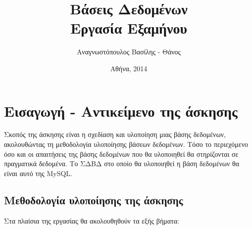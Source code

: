 \documentclass{assignment}
\title{Βάσεις Δεδομένων \\ Εργασία Εξαμήνου}
\date{Αθήνα, 2014}
\author{Αναγνωστόπουλος Βασίλης - Θάνος}
\begin{document}
\maketitle

\setcounter{page}{1} 

\pagestyle{plain}
\tableofcontents
\newpage


\pagestyle{fancy}
\setcounter{page}{1} 

\section{Εισαγωγή - Αντικείμενο της άσκησης}

Σκοπός της άσκησης είναι η σχεδίαση και υλοποίηση μιας βάσης δεδομένων,
ακολουθώντας τη μεθοδολογία υλοποίησης βάσεων δεδομένων. Τόσο το περιεχόμενο όσο και οι απαιτήσεις της βάσης δεδομένων που θα
υλοποιηθεί θα στηρίζονται σε πραγματικά δεδομένα. Το ΣΔΒΔ στο οποίο θα υλοποιηθεί η βάση δεδομένων θα είναι αυτό της MySQL.

\subsection{Μεθοδολογία υλοποίησης της άσκησης}

Στα πλαίσια της εργασίας θα ακολουθηθούν τα εξής βήματα:
\end{document}
